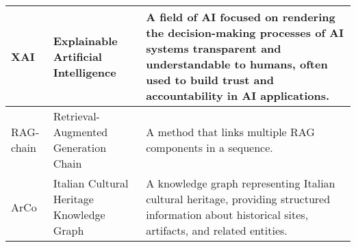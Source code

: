 \begin{tabularx}{\textwidth}{
  >{\raggedright\arraybackslash}p{2.5cm}
  >{\raggedright\arraybackslash}p{4cm}
  >{\noindent\justifying\arraybackslash}X
}
\cmidrule(lr){1-3}
XAI & Explainable Artificial Intelligence & A field of AI focused on rendering the decision-making processes of AI systems transparent and understandable to humans, often used to build trust and accountability in AI applications. \\
\cmidrule(lr){1-3}
RAG-chain & Retrieval-Augmented Generation Chain & A method that links multiple RAG components in a sequence. \\
\cmidrule(lr){1-3}
ArCo & Italian Cultural Heritage Knowledge Graph & A knowledge graph representing Italian cultural heritage, providing structured information about historical sites, artifacts, and related entities. \\
\bottomrule
\end{tabularx}
